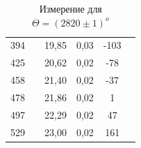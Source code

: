 \documentclass[a4paper,12pt]{report}
\begin{document}
\begin{table}[H]
\begin{tabular}{|c|c|c|c|c|c|}
394 &                     & 19,85 & 0,03 & -103 &                     \\ \cline{1-1} \cline{3-5}
425 &                     & 20,62 & 0,02 & -78  &                     \\ \cline{1-1} \cline{3-5}
458 &                     & 21,40 & 0,02 & -37  &                     \\ \cline{1-1} \cline{3-5}
478 &                     & 21,86 & 0,02 & 1    &                     \\ \cline{1-1} \cline{3-5}
497 &                     & 22,29 & 0,02 & 47   &                     \\ \cline{1-1} \cline{3-5}
529 &                     & 23,00 & 0,02 & 161  &                     \\ \hline
\end{tabular}
\caption{Измерение для $\Theta = (2820\pm 1) ^{o}$}
\end{table}
\end{document}
